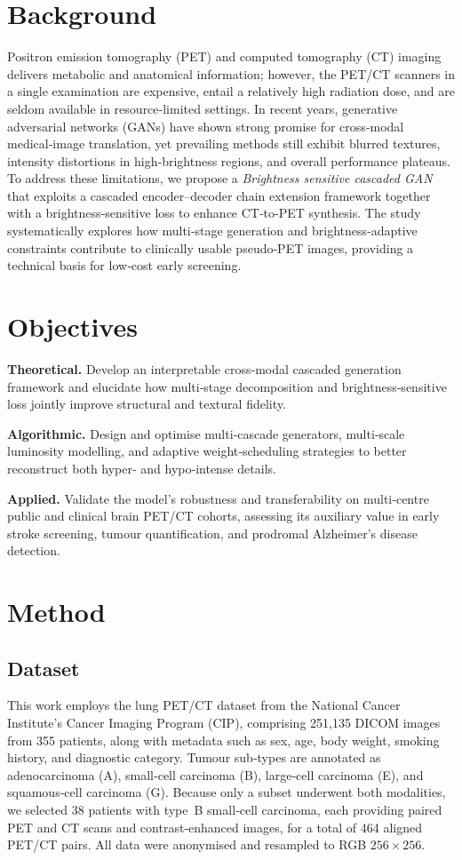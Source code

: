 \documentclass[twocolumn]{article}
\begin{document}
\section{Background}
Positron emission tomography (PET) and computed tomography (CT) imaging delivers metabolic and anatomical information; however, the PET/CT scanners in a single examination are expensive, entail a relatively high radiation dose, and are seldom available in resource‑limited settings. In recent years, generative adversarial networks (GANs) \cite{radford_unsupervised_2015} have shown strong promise for cross‑modal medical‑image translation, yet prevailing methods still exhibit blurred textures, intensity distortions in high‑brightness regions, and overall performance plateaus. To address these limitations, we propose a \emph{Brightness sensitive cascaded GAN} that exploits a cascaded encoder–decoder chain extension framework together with a brightness‑sensitive loss to enhance CT‑to‑PET synthesis. The study systematically explores how multi‑stage generation and brightness‑adaptive constraints contribute to clinically usable pseudo‑PET images, providing a technical basis for low‑cost early screening.

\section{Objectives}
\textbf{Theoretical.} Develop an interpretable cross‑modal cascaded generation framework and elucidate how multi‑stage decomposition and brightness‑sensitive loss jointly improve structural and textural fidelity.

\textbf{Algorithmic.} Design and optimise multi‑cascade generators, multi‑scale luminosity modelling, and adaptive weight‑scheduling strategies to better reconstruct both hyper‑ and hypo‑intense details.

\textbf{Applied.} Validate the model’s robustness and transferability on multi‑centre public and clinical brain PET/CT cohorts, assessing its auxiliary value in early stroke screening, tumour quantification, and prodromal Alzheimer’s disease detection.

\section{Method}
\subsection{Dataset}
This work employs the lung PET/CT dataset from the National Cancer Institute’s Cancer Imaging Program (CIP)\cite{li_large-scale_2020}, comprising 251,135 DICOM images from 355 patients, along with metadata such as sex, age, body weight, smoking history, and diagnostic category. Tumour sub‑types are annotated as adenocarcinoma (A), small‑cell carcinoma (B), large‑cell carcinoma (E), and squamous‑cell carcinoma (G). Because only a subset underwent both modalities, we selected 38 patients with type B small‑cell carcinoma, each providing paired PET and CT scans and contrast‑enhanced images, for a total of 464 aligned PET/CT pairs. All data were anonymised and resampled to RGB $256\times256$.
\end{document}
